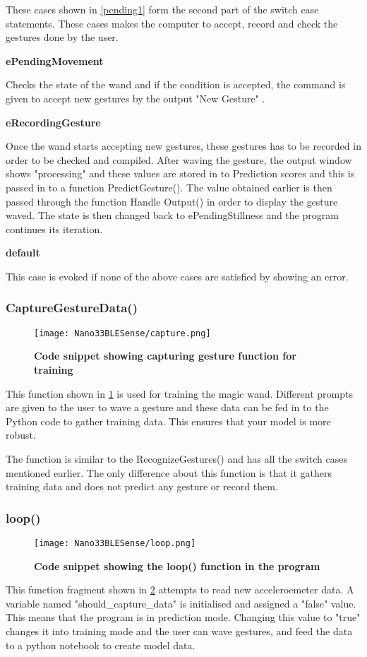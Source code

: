 These cases shown in \ref{pending1} form the second part of the switch case statements. These cases makes the computer to accept, record and check the gestures done by the user. 

\textbf{ePendingMovement}

Checks the state of the wand and if the condition is accepted, the command is given to accept new gestures by the output "New Gesture" .


\textbf{eRecordingGesture}

Once the wand starts accepting new gestures, these gestures has to be recorded in order to be checked and compiled.  After waving the gesture, the output window shows "processing" and these values are stored in to Prediction scores and this is  passed in to a  function PredictGesture(). The value obtained earlier is then passed through the function Handle Output() in order to display the gesture waved. The state is then changed back to ePendingStillness and the program continues its iteration.

\textbf{default}

This case is evoked if none of the above cases are satisfied by showing an error. 

\subsubsection{CaptureGestureData()}

\begin{figure}[h!]
    \texttt{[image: Nano33BLESense/capture.png]}
    \caption{\textbf{Code snippet showing capturing gesture function for training}}
    \label{capture}
\end{figure}

This function shown in \ref{capture} is used for training the magic wand. Different prompts are given to the user to wave a gesture and these data can be fed in to the Python code to gather training data. This ensures that your model is more robust.

The function is similar to the RecognizeGestures()  and has all the switch cases mentioned earlier. The only difference about this function is that it gathers training data and does not predict any gesture or record them.

\subsubsection{loop()} 

\begin{figure}[h!]
    \texttt{[image: Nano33BLESense/loop.png]}
    \caption{\textbf{Code snippet showing the loop() function in the program}}
    \label{loop}
\end{figure}
This function fragment shown in \ref{loop} attempts to read new acceleroemeter data. A variable named "should\_capture\_data" is initialised and assigned a "false" value. This means that the program is in prediction mode. Changing this value to "true" changes it into training mode and the user can wave gestures, and feed the data to a python notebook to create model data. 

